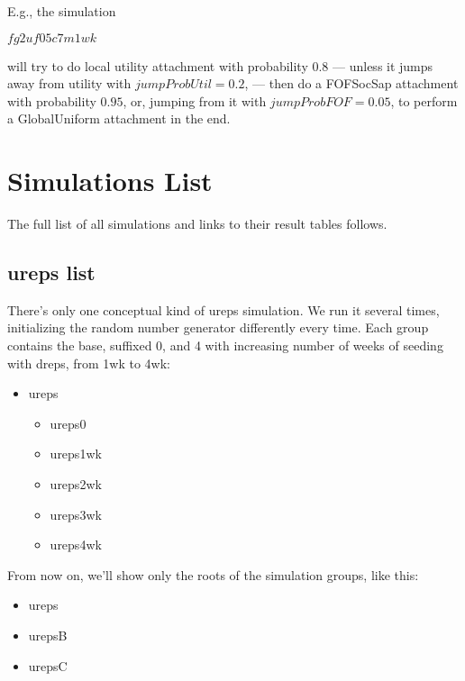 \documentclass[10pt,oneside]{memoir}
\begin{document}
E.g., the simulation


$fg2uf05c7m1wk$


will try to do local utility attachment with probability $0.8$ --- unless it jumps away from utility with $jumpProbUtil = 0.2$, --- then do a FOFSocSap attachment with probability $0.95$, or, jumping from it with $jumpProbFOF = 0.05$, to perform a GlobalUniform attachment in the end.


\section{Simulations List}
\label{simulationslist}

The full list of all simulations and links to their result tables follows.


\subsection{ureps list}
\label{urepslist}

There's only one conceptual kind of ureps simulation.  We run it several times, initializing the random number generator differently every time.  Each group contains the base, suffixed 0, and 4 with increasing number of weeks of seeding with dreps, from 1wk to 4wk:


\begin{itemize}


\item ureps
\begin{itemize}


\item ureps0

\item ureps1wk

\item ureps2wk

\item ureps3wk

\item ureps4wk
\end{itemize}


\end{itemize}

From now on, we'll show only the roots of the simulation groups, like this:


\begin{itemize}


\item ureps

\item urepsB

\item urepsC
\end{itemize}
\end{document}
